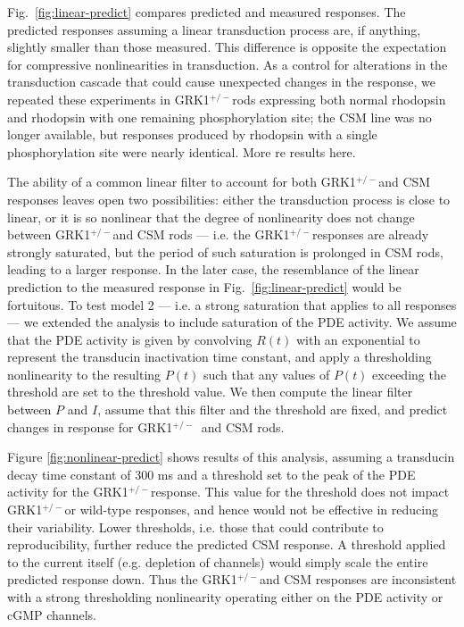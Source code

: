 \documentclass[12pt]{article}
\def\RKHET{GRK1$^{+/-}$}
\begin{document}
Fig.~\ref{fig:linear-predict} compares predicted and measured responses.  The predicted responses assuming a linear transduction process are, if anything, slightly smaller than those measured.  This difference is opposite the expectation for compressive nonlinearities in transduction.  As a control for alterations in the transduction cascade that could cause unexpected changes in the response, we repeated these experiments in \RKHET rods expressing both normal rhodopsin and rhodopsin with one remaining phosphorylation site; the CSM line was no longer available, but responses produced by rhodopsin with a single phosphorylation site were nearly identical.  More re results here.

The ability of a common linear filter to account for both \RKHET and CSM responses leaves open two possibilities: either the transduction process is close to linear, or it is so nonlinear that the degree of nonlinearity does not change between \RKHET and CSM rods --- i.e. the \RKHET responses are already strongly saturated, but the period of such saturation is prolonged in CSM rods, leading to a larger response.  In the later case, the resemblance of the linear prediction to the measured response in Fig.~\ref{fig:linear-predict} would be fortuitous.  To test model 2 --- i.e. a strong saturation that applies to all responses ---  we extended the analysis to include saturation of the PDE activity.  We assume that the PDE activity is given by convolving $R(t)$ with an exponential to represent the transducin inactivation time constant, and apply a thresholding nonlinearity to the resulting $P(t)$ such that any values of $P(t)$ exceeding the threshold are set to the threshold value.  We then compute the linear filter between $P$ and $I$, assume that this filter and the threshold are fixed, and predict changes in response for \RKHET~and CSM rods.  

Figure \ref{fig:nonlinear-predict} shows results of this analysis, assuming a transducin decay time constant of 300 ms and a threshold set to the peak of the PDE activity for the \RKHET response.  This value for the threshold does not impact \RKHET or wild-type responses, and hence would not be effective in reducing their variability.  Lower thresholds, i.e. those that could contribute to reproducibility, further reduce the predicted CSM response.  A threshold applied to the current itself (e.g. depletion of channels) would simply scale the entire predicted response down.  Thus the \RKHET and CSM responses are inconsistent with a strong thresholding nonlinearity operating either on the PDE activity or cGMP channels.
\end{document}
